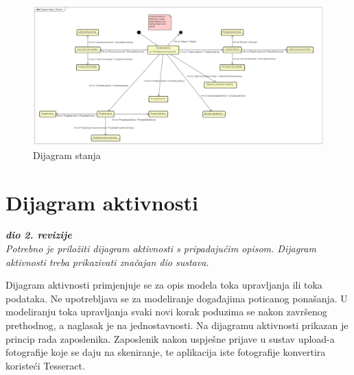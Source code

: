 			\begin{figure}[H]
				\includegraphics[scale=0.5]{slike/dijagram_stanja_direktor.png} %
				\centering
				\caption{Dijagram stanja}
				\label{fig:promjene}
			\end{figure}

			\eject 
		
		\section{Dijagram aktivnosti}
			
			\textbf{\textit{dio 2. revizije}}\\
			
			 \textit{Potrebno je priložiti dijagram aktivnosti s pripadajućim opisom. Dijagram aktivnosti treba prikazivati značajan dio sustava.}
			
			Dijagram aktivnosti primjenjuje se za opis modela toka upravljanja ili toka podataka. Ne upotrebljava se za modeliranje događajima poticanog ponašanja. U modeliranju toka upravljanja svaki novi korak poduzima se nakon završenog prethodnog, a naglasak je na jednostavnosti. Na dijagramu aktivnosti prikazan je princip rada zaposlenika. Zaposlenik nakon uspješne prijave u sustav upload-a fotografije koje se daju na skeniranje, te aplikacija iste fotografije konvertira koristeći Tesseract.

